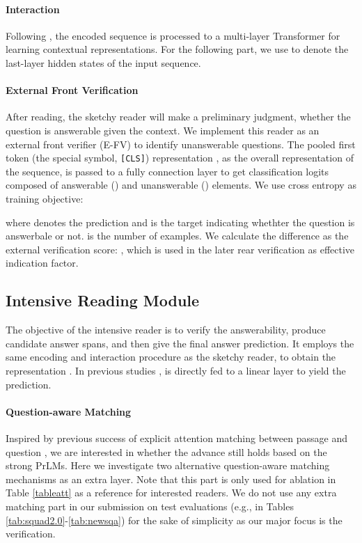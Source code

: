 \documentclass[letterpaper]{article} \usepackage{aaai21}  \usepackage{times}  \usepackage{helvet} \usepackage{courier}  \usepackage[hyphens]{url}  \usepackage{graphicx}
\begin{document}
\paragraph{Interaction}
Following \citet{devlin2018bert}, the encoded sequence  is processed to a multi-layer Transformer \cite{DBLP:conf/nips/VaswaniSPUJGKP17} for learning contextual representations. For the following part, we use  to denote the last-layer hidden states of the input sequence.






\paragraph{External Front Verification}
After reading, the sketchy reader will make a preliminary judgment, whether the question is answerable given the context. We implement this reader as an external front verifier (E-FV) to identify unanswerable questions. The pooled first token (the special symbol, \texttt{[CLS]}) representation , as the overall representation of the sequence, is passed to a fully connection layer to get classification logits  composed of answerable () and unanswerable () elements. We use cross entropy as training objective: 

where  denotes the prediction and  is the target indicating whethter the question is answerbale or not.  is the number of examples. We calculate the difference as the external verification score: , which is used in the later rear verification as effective indication factor. 

\subsection{Intensive Reading Module}\label{sec:intensive}
The objective of the intensive reader is to verify the answerability, produce candidate answer spans, and then give the final answer prediction. It employs the same encoding and interaction procedure as the sketchy reader, to obtain the representation . In previous studies \cite{devlin2018bert,yang2019xlnet,Lan2020ALBERT},  is directly fed to a linear layer to yield the prediction. 


\paragraph{Question-aware Matching}
Inspired by previous success of explicit attention matching between passage and question \cite{kadlec2016text,Dhingra2017Gated,Wang2017Gated,Seo2016Bidirectional}, we are interested in whether the advance still holds based on the strong PrLMs. Here we investigate two alternative question-aware matching mechanisms as an extra layer. Note that this part is only used for ablation in Table \ref{tableatt} as a reference for interested readers. We do not use any extra matching part in our submission on test evaluations (e.g., in Tables \ref{tab:squad2.0}-\ref{tab:newsqa}) for the sake of simplicity as our major focus is the verification.
\end{document}
